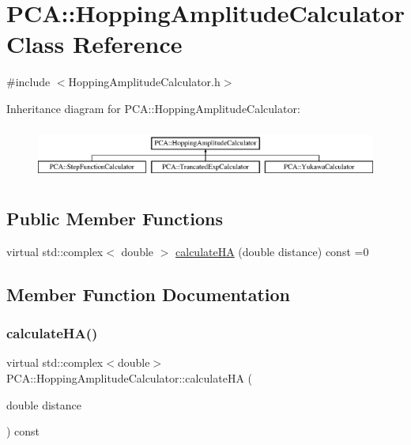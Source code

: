 \hypertarget{class_p_c_a_1_1_hopping_amplitude_calculator}{}\section{P\+CA\+:\+:Hopping\+Amplitude\+Calculator Class Reference}
\label{class_p_c_a_1_1_hopping_amplitude_calculator}


{\ttfamily \#include $<$Hopping\+Amplitude\+Calculator.\+h$>$}

Inheritance diagram for P\+CA\+:\+:Hopping\+Amplitude\+Calculator\+:\begin{figure}[H]
\begin{center}
\leavevmode
\includegraphics[height=1.761006cm]{class_p_c_a_1_1_hopping_amplitude_calculator}
\end{center}
\end{figure}
\subsection*{Public Member Functions}
\begin{DoxyCompactItemize}
\item 
virtual std\+::complex$<$ double $>$ \hyperlink{class_p_c_a_1_1_hopping_amplitude_calculator_ae925735be8ef006f3f8dfdc1a23cae89}{calculate\+HA} (double distance) const =0
\end{DoxyCompactItemize}


\subsection{Member Function Documentation}
\hypertarget{class_p_c_a_1_1_hopping_amplitude_calculator_ae925735be8ef006f3f8dfdc1a23cae89}{}\label{class_p_c_a_1_1_hopping_amplitude_calculator_ae925735be8ef006f3f8dfdc1a23cae89} 
\subsubsection{\texorpdfstring{calculate\+H\+A()}{calculateHA()}}
{\footnotesize\ttfamily virtual std\+::complex$<$double$>$ P\+C\+A\+::\+Hopping\+Amplitude\+Calculator\+::calculate\+HA (\begin{DoxyParamCaption}\item[{double}]{distance }\end{DoxyParamCaption}) const\hspace{0.3cm}{\ttfamily [pure virtual]}}



